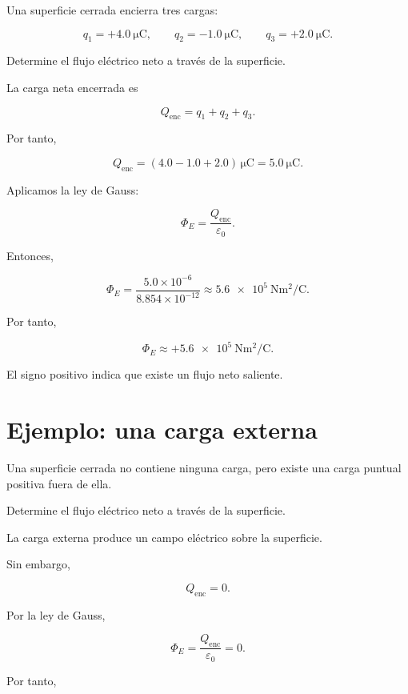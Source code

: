 \begin{ejemplo}

Una superficie cerrada encierra tres cargas:

\[
q_1=+\SI{4.0}{\micro\coulomb},\qquad
q_2=-\SI{1.0}{\micro\coulomb},\qquad
q_3=+\SI{2.0}{\micro\coulomb}.
\]

Determine el flujo eléctrico neto a través de la superficie.

\end{ejemplo}

La carga neta encerrada es

\[
Q_{\text{enc}}=q_1+q_2+q_3.
\]

Por tanto,

\[
Q_{\text{enc}}=(4.0-1.0+2.0)\,\si{\micro\coulomb}
=\SI{5.0}{\micro\coulomb}.
\]

Aplicamos la ley de Gauss:

\[
\Phi_E=\frac{Q_{\text{enc}}}{\varepsilon_0}.
\]

Entonces,

\[
\Phi_E=
\frac{5.0\times10^{-6}}{8.854\times10^{-12}}
\approx
\SI{5.6e5}{\newton\metre\squared\per\coulomb}.
\]

Por tanto,

\[
\boxed{
\Phi_E\approx
+\SI{5.6e5}{\newton\metre\squared\per\coulomb}
}.
\]

El signo positivo indica que existe un flujo neto saliente.


\section{Ejemplo: una carga externa}

\begin{ejemplo}

Una superficie cerrada no contiene ninguna carga, pero existe una carga puntual
positiva fuera de ella.

Determine el flujo eléctrico neto a través de la superficie.

\end{ejemplo}

La carga externa produce un campo eléctrico sobre la superficie.

Sin embargo,

\[
Q_{\text{enc}}=0.
\]

Por la ley de Gauss,

\[
\Phi_E=\frac{Q_{\text{enc}}}{\varepsilon_0}=0.
\]

Por tanto,

